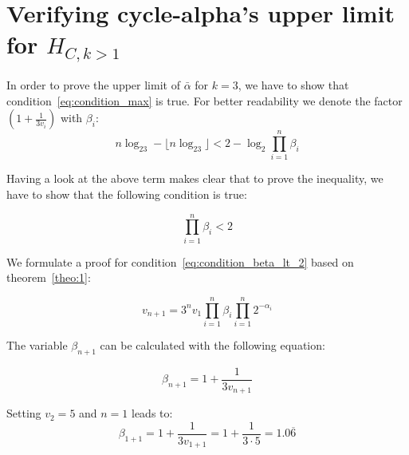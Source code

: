 

\section{Verifying cycle-alpha's upper limit for $H_{C,k>1}$}

In order to prove the upper limit of $\bar\alpha$ for $k=3$, we have to show that condition~\ref{eq:condition_max} is true. For better readability we denote the factor $(1+\frac{1}{3v_i})$ with $\beta_i$:
\begin{equation*}
	n\log_23-\lfloor n\log_23\rfloor<2-\log_2\prod_{i=1}^{n}\beta_i
\end{equation*}

Having a look at the above term makes clear that to prove the inequality, we have to show that the following condition is true:

\begin{equation}
\label{eq:condition_beta_lt_2}
	\prod_{i=1}^{n}\beta_i<2
\end{equation}

We formulate a proof for condition~\ref{eq:condition_beta_lt_2} based on theorem~\ref{theo:1}:

\begin{equation}
\label{eq:based_theo_1}
v_{n+1}=3^nv_1\prod_{i=1}^{n}\beta_i\prod_{i=1}^{n}2^{-\alpha_i}
\end{equation}

The variable $\beta_{n+1}$ can be calculated with the following equation:

\begin{equation}
\label{eq:beta_n_plus_1}
\beta_{n+1}=1+\frac{1}{3v_{n+1}}
\end{equation}

\begin{example}
	Setting $v_2=5$ and $n=1$ leads to:
	\[
	\beta_{1+1}=1+\frac{1}{3v_{1+1}}=1+\frac{1}{3\cdot5}=1.0\overline{6}
	\]
\end{example}

